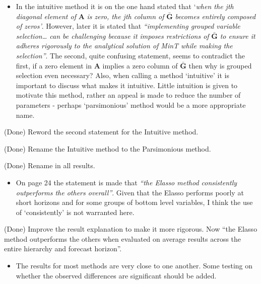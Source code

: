 \documentclass[11pt,a4paper,]{article}
\providecommand{\tightlist}{%
  \setlength{\itemsep}{0pt}\setlength{\parskip}{0pt}}
\renewenvironment{quote}
               {\list{}{\rightmargin\leftmargin}%
                \item\relax\color[RGB]{0,150,0}}
               {\endlist}
\begin{document}
\begin{itemize}
\tightlist
\item
  In the intuitive method it is on the one hand stated that `\emph{when
  the jth diagonal element of} \(\bm{A}\) \emph{is zero, the jth column
  of} \(\bar{\bm{G}}\) \emph{becomes entirely composed of zeros'}.
  However, later it is stated that \emph{``implementing grouped variable
  selection\ldots{} can be challenging because it imposes restrictions
  of} \(\bar{\bm{G}}\) \emph{to ensure it adheres rigorously to the
  analytical solution of MinT while making the selection''}. The second,
  quite confusing statement, seems to contradict the first, if a zero
  element in \(\bm{A}\) implies a zero column of \(\bar{\bm{G}}\) then
  why is grouped selection even necessary? Also, when calling a method
  `intuitive' it is important to discuss what makes it intuitive. Little
  intuition is given to motivate this method, rather an appeal is made
  to reduce the number of parameters - perhaps `parsimonious' method
  would be a more appropriate name.
\end{itemize}

\begin{quote}
(Done) Reword the second statement for the Intuitive method.

(Done) Rename the Intuitive method to the Parsimonious method.

(Done) Rename in all results.
\end{quote}

\begin{itemize}
\tightlist
\item
  On page 24 the statement is made that \emph{``the Elasso method
  consistently outperforms the others overall''}. Given that the Elasso
  performs poorly at short horizons and for some groups of bottom level
  variables, I think the use of `consistently' is not warranted here.
\end{itemize}

\begin{quote}
(Done) Improve the result explanation to make it more rigorous. Now
``the Elasso method outperforms the others when evaluated on average
results across the entire hierarchy and forecast horizon''.
\end{quote}

\begin{itemize}
\tightlist
\item
  The results for most methods are very close to one another. Some
  testing on whether the observed differences are significant should be
  added.
\end{itemize}
\end{document}
